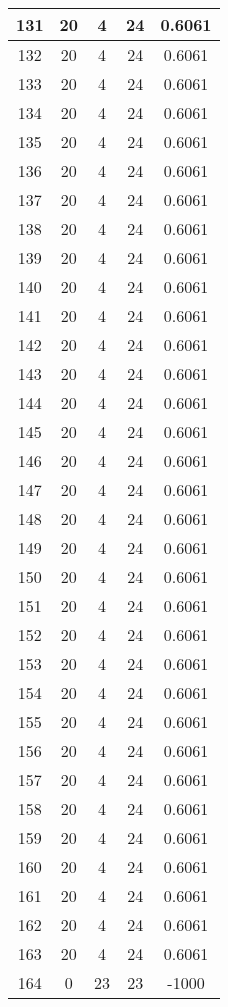 \documentclass[letterpaper, 12pt]{article}
\begin{document}
\begin{longtable}{|c|c|c|c|c|}
\hline
131 & 20 & 4 & 24 & 0.6061 \\
\hline
132 & 20 & 4 & 24 & 0.6061 \\
\hline
133 & 20 & 4 & 24 & 0.6061 \\
\hline
134 & 20 & 4 & 24 & 0.6061 \\
\hline
135 & 20 & 4 & 24 & 0.6061 \\
\hline
136 & 20 & 4 & 24 & 0.6061 \\
\hline
137 & 20 & 4 & 24 & 0.6061 \\
\hline
138 & 20 & 4 & 24 & 0.6061 \\
\hline
139 & 20 & 4 & 24 & 0.6061 \\
\hline
140 & 20 & 4 & 24 & 0.6061 \\
\hline
141 & 20 & 4 & 24 & 0.6061 \\
\hline
142 & 20 & 4 & 24 & 0.6061 \\
\hline
143 & 20 & 4 & 24 & 0.6061 \\
\hline
144 & 20 & 4 & 24 & 0.6061 \\
\hline
145 & 20 & 4 & 24 & 0.6061 \\
\hline
146 & 20 & 4 & 24 & 0.6061 \\
\hline
147 & 20 & 4 & 24 & 0.6061 \\
\hline
148 & 20 & 4 & 24 & 0.6061 \\
\hline
149 & 20 & 4 & 24 & 0.6061 \\
\hline
150 & 20 & 4 & 24 & 0.6061 \\
\hline
151 & 20 & 4 & 24 & 0.6061 \\
\hline
152 & 20 & 4 & 24 & 0.6061 \\
\hline
153 & 20 & 4 & 24 & 0.6061 \\
\hline
154 & 20 & 4 & 24 & 0.6061 \\
\hline
155 & 20 & 4 & 24 & 0.6061 \\
\hline
156 & 20 & 4 & 24 & 0.6061 \\
\hline
157 & 20 & 4 & 24 & 0.6061 \\
\hline
158 & 20 & 4 & 24 & 0.6061 \\
\hline
159 & 20 & 4 & 24 & 0.6061 \\
\hline
160 & 20 & 4 & 24 & 0.6061 \\
\hline
161 & 20 & 4 & 24 & 0.6061 \\
\hline
162 & 20 & 4 & 24 & 0.6061 \\
\hline
163 & 20 & 4 & 24 & 0.6061 \\
\hline
164 & 0 & 23 & 23 & -1000 \\

\end{longtable}
\end{document}
